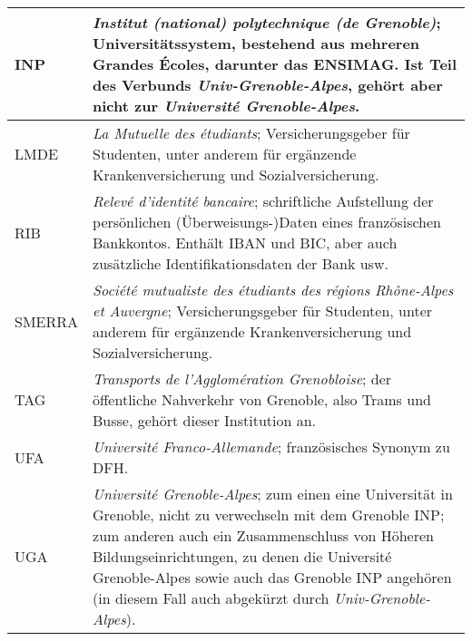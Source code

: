 \documentclass[11pt,a4paper]{article}
\begin{document}
\begin{tabularx}{\columnwidth}{|l|X|}
		INP & \emph{Institut (national) polytechnique (de Grenoble)}; Universitätssystem, bestehend aus mehreren Grandes Écoles, darunter das ENSIMAG. Ist Teil des Verbunds \emph{Univ-Grenoble-Alpes}, gehört aber nicht zur \emph{Université Grenoble-Alpes}. \\ \hline
		LMDE & \emph{La Mutuelle des étudiants}; Versicherungsgeber für Studenten, unter anderem für ergänzende Krankenversicherung und Sozialversicherung.\\ \hline
		RIB & \emph{Relevé d'identité bancaire}; schriftliche Aufstellung der persönlichen (Überweisungs-)Daten eines französischen Bankkontos. Enthält IBAN und BIC, aber auch zusätzliche Identifikationsdaten der Bank usw.\\ \hline
		SMERRA & \emph{Société mutualiste des étudiants des régions Rhône-Alpes et Auvergne}; Versicherungsgeber für Studenten, unter anderem für ergänzende Krankenversicherung und Sozialversicherung.\\ \hline
		TAG & \emph{Transports de l'Agglomération Grenobloise}; der öffentliche Nahverkehr von Grenoble, also Trams und Busse, gehört dieser Institution an.\\ \hline
		UFA & \emph{Université Franco-Allemande}; französisches Synonym zu DFH. \\ \hline
		UGA & \emph{Université Grenoble-Alpes}; zum einen eine Universität in Grenoble, nicht zu verwechseln mit dem Grenoble INP; zum anderen auch ein Zusammenschluss von Höheren Bildungseinrichtungen, zu denen die Université Grenoble-Alpes sowie auch das Grenoble INP angehören (in diesem Fall auch abgekürzt durch \emph{Univ-Grenoble-Alpes}). \\ \hline
	\end{tabularx}
	
\end{document}
